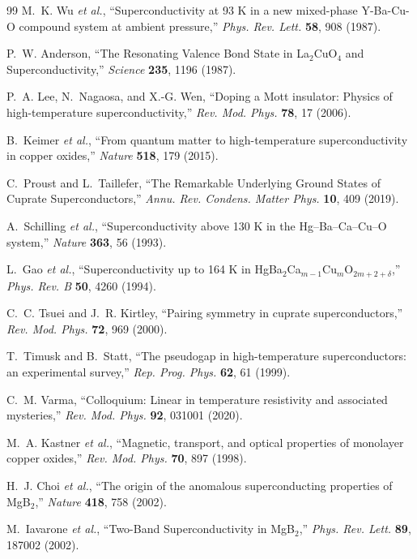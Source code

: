 \documentclass[aps,prb,twocolumn,superscriptaddress,floatfix,nofootinbib,longbibliography]{revtex4-2}
\begin{document}
\begin{thebibliography}{99}
M.~K. Wu \textit{et al.}, ``Superconductivity at 93 K in a new mixed-phase
Y-Ba-Cu-O compound system at ambient pressure,'' \textit{Phys. Rev. Lett.}
\textbf{58}, 908 (1987).

P.~W. Anderson, ``The Resonating Valence Bond State in La$_2$CuO$_4$ and
Superconductivity,'' \textit{Science} \textbf{235}, 1196 (1987).

P.~A. Lee, N.~Nagaosa, and X.-G. Wen, ``Doping a Mott insulator: Physics
of high-temperature superconductivity,'' \textit{Rev. Mod. Phys.}
\textbf{78}, 17 (2006).

B.~Keimer \textit{et al.}, ``From quantum matter to high-temperature
superconductivity in copper oxides,'' \textit{Nature} \textbf{518}, 179 (2015).

C.~Proust and L.~Taillefer, ``The Remarkable Underlying Ground States of
Cuprate Superconductors,'' \textit{Annu. Rev. Condens. Matter Phys.}
\textbf{10}, 409 (2019).

A.~Schilling \textit{et al.}, ``Superconductivity above 130 K in the
Hg--Ba--Ca--Cu--O system,'' \textit{Nature} \textbf{363}, 56 (1993).

L.~Gao \textit{et al.}, ``Superconductivity up to 164 K in
HgBa$_2$Ca$_{m-1}$Cu$_m$O$_{2m+2+\delta}$,'' \textit{Phys. Rev. B}
\textbf{50}, 4260 (1994).

C.~C. Tsuei and J.~R. Kirtley, ``Pairing symmetry in cuprate
superconductors,'' \textit{Rev. Mod. Phys.} \textbf{72}, 969 (2000).

T.~Timusk and B.~Statt, ``The pseudogap in high-temperature superconductors:
an experimental survey,'' \textit{Rep. Prog. Phys.} \textbf{62}, 61 (1999).

C.~M. Varma, ``Colloquium: Linear in temperature resistivity and associated
mysteries,'' \textit{Rev. Mod. Phys.} \textbf{92}, 031001 (2020).

M.~A. Kastner \textit{et al.}, ``Magnetic, transport, and optical properties
of monolayer copper oxides,'' \textit{Rev. Mod. Phys.} \textbf{70}, 897 (1998).

H.~J. Choi \textit{et al.}, ``The origin of the anomalous superconducting
properties of MgB$_2$,'' \textit{Nature} \textbf{418}, 758 (2002).

M.~Iavarone \textit{et al.}, ``Two-Band Superconductivity in MgB$_2$,''
\textit{Phys. Rev. Lett.} \textbf{89}, 187002 (2002).


\end{thebibliography}
\end{document}
